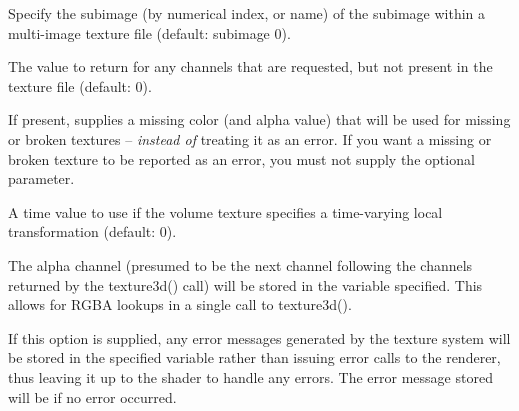 \documentclass[11pt,letterpaper]{book}
\begin{document}
\vspace{12pt}
Specify the subimage (by numerical index, or name) of the subimage
within a multi-image texture file (default: subimage 0).
\apiend
\vspace{-16pt}

\vspace{12pt}
The value to return for any channels that are requested,
but not present in the texture file (default: 0).
\apiend
\vspace{-16pt}

\vspace{12pt}
If present, supplies a missing color (and alpha value) that will
be used for missing or broken textures -- \emph{instead of} treating
it as an error.  If you want a missing or broken texture to be reported
as an error, you must not supply the optional 
parameter.
\apiend
\vspace{-16pt}

\vspace{12pt}
A time value to use if the volume texture specifies a time-varying
local transformation (default: 0).
\apiend
\vspace{-16pt}

\vspace{12pt}
The alpha channel (presumed to be the next channel following the
channels returned by the {\cf texture3d()} call) will be stored in the
variable specified.  This allows for RGBA lookups in a single call to
{\cf texture3d()}.
\apiend
\vspace{-16pt}

\vspace{12pt}
If this option is supplied, any error messages generated by the texture
system will be stored in the specified variable rather than issuing error
calls to the renderer, thus leaving it up to the shader to handle any
errors. The error message stored will be \qkw{} if no error occurred.
\apiend
\vspace{-16pt}

\apiend

\end{document}
